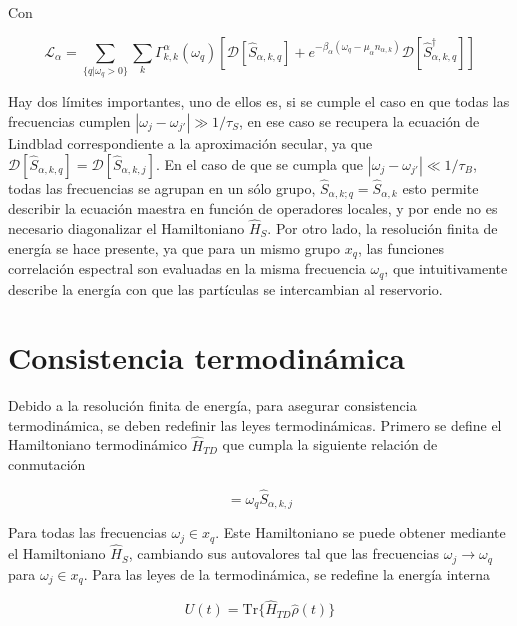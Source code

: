 Con

\begin{equation}
    \mathcal{L}_{\alpha} = \sum_{\{q|\omega_{q}>0\}} \sum_{k}\Gamma^{\alpha}_{k,k}(\omega_{q}) \left[ \mathcal{D}[\hat{S}_{\alpha,k,q}] + e^{-\beta_{\alpha}(\omega_{q} - \mu_{\alpha}n_{\alpha,k})}\mathcal{D}[\hat{S}^{\dagger}_{\alpha,k,q}]  \right]
\label{sec2lindbladconsistency}
\end{equation}

Hay dos límites importantes, uno de ellos es, si se cumple el caso en que todas las frecuencias cumplen $|\omega_{j}-\omega_{j'}| \gg 1/\tau_{S}$, en ese caso se recupera la ecuación de Lindblad correspondiente a la aproximación secular, ya que $\mathcal{D}[\hat{S}_{\alpha,k,q}] = \mathcal{D}[\hat{S}_{\alpha,k,j}]$. En el caso de que se cumpla que $|\omega_{j}-\omega_{j'}| \ll 1/\tau_{B}$, todas las frecuencias se agrupan en un sólo grupo, $\hat{S}_{\alpha,k;q} = \hat{S}_{\alpha,k}$ esto permite describir la ecuación maestra en función de operadores locales, y por ende no es necesario diagonalizar el Hamiltoniano $\hat{H}_{S}$\cite{wichterich2007modeling}. Por otro lado, la resolución finita de energía se hace presente, ya  que para un mismo grupo $x_{q}$, las funciones correlación espectral son evaluadas en la misma frecuencia $\omega_{q}$, que intuitivamente describe la energía con que las partículas se intercambian al reservorio.  

\section{Consistencia termodinámica}
Debido a la resolución finita de energía, para asegurar consistencia termodinámica, se deben redefinir las leyes termodinámicas. Primero se define el Hamiltoniano termodinámico $\hat{H}_{TD}$ que cumpla la siguiente relación de conmutación

\begin{equation*}
    [\hat{S}_{\alpha,k,j},\hat{H}_{TD}] = \omega_{q}\hat{S}_{\alpha,k,j}
\end{equation*}

Para todas las frecuencias $\omega_{j} \in x_{q}$. Este Hamiltoniano se puede obtener mediante el Hamiltoniano $\hat{H}_{S}$, cambiando sus autovalores tal que las frecuencias $\omega_{j} \to \omega_{q}$ para $\omega_{j} \in x_{q}$. Para las leyes de la termodinámica, se redefine la energía interna

\begin{equation*}
    U(t) = \text{Tr}\{\hat{H}_{TD}\hat{\rho}(t) \}
\end{equation*}

